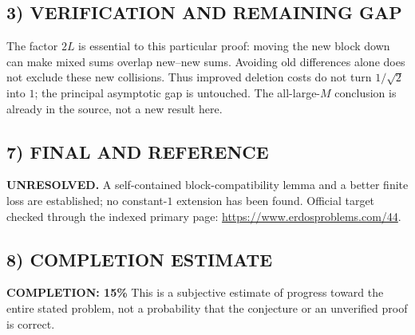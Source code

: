 \subsection*{3) VERIFICATION AND REMAINING GAP}
The factor $2L$ is essential to this particular proof: moving the new block
down can make mixed sums overlap new--new sums. Avoiding old differences
alone does not exclude these new collisions. Thus improved deletion costs
do not turn $1/\sqrt2$ into $1$; the principal asymptotic gap is untouched.
The all-large-$M$ conclusion is already in the source, not a new result here.

\subsection*{7) FINAL AND REFERENCE}
\textbf{UNRESOLVED.} A self-contained block-compatibility lemma and a better
finite loss are established; no constant-$1$ extension has been found.
Official target checked through the indexed primary page:
\url{https://www.erdosproblems.com/44}.

\subsection*{8) COMPLETION ESTIMATE}
\textbf{COMPLETION: 15\%}
This is a subjective estimate of progress toward the entire stated problem, not a probability that the conjecture or an unverified proof is correct.
